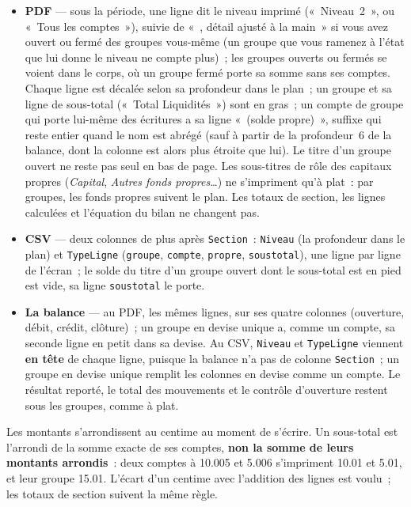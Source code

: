 \documentclass[a4paper,11pt,oneside]{article}
\begin{document}
\begin{itemize}
    \item \textbf{PDF} --- sous la période, une ligne dit le niveau imprimé («~Niveau~2~», ou
          «~Tous les comptes~»), suivie de «~, détail ajusté à la main~» si vous avez ouvert ou
          fermé des groupes vous-même (un groupe que vous ramenez à l'état que lui donne le niveau ne
          compte plus)~; les groupes ouverts ou fermés se voient dans le corps, où
          un groupe fermé porte sa somme sans ses comptes. Chaque ligne est décalée selon sa
          profondeur dans le plan~; un groupe et sa ligne de sous-total («~Total Liquidités~») sont
          en gras~; un compte de groupe qui porte lui-même des écritures a sa ligne
          «~(solde propre)~», suffixe qui reste entier quand le nom est abrégé (sauf à partir de la profondeur~6 de la balance, dont la colonne est alors plus étroite que lui). Le titre d'un groupe ouvert ne reste pas seul en bas de page. Les
          sous-titres de rôle des capitaux propres (\emph{Capital}, \emph{Autres fonds
          propres}\ldots) ne s'impriment qu'à plat~: par groupes, les fonds propres suivent le plan.
          Les totaux de section, les lignes calculées et l'équation du bilan ne changent pas.
    \item \textbf{CSV} --- deux colonnes de plus après \texttt{Section}~: \texttt{Niveau} (la
          profondeur dans le plan) et \texttt{TypeLigne} (\texttt{groupe}, \texttt{compte},
          \texttt{propre}, \texttt{soustotal}), une ligne par ligne de l'écran~; le solde du titre
          d'un groupe ouvert dont le sous-total est en pied est vide, sa ligne \texttt{soustotal}
          le porte.
    \item \textbf{La balance} --- au PDF, les mêmes lignes, sur ses quatre colonnes (ouverture,
          débit, crédit, clôture)~; un groupe en devise unique a, comme un compte, sa seconde ligne en
          petit dans sa devise. Au CSV, \texttt{Niveau} et \texttt{TypeLigne} viennent \textbf{en
          tête} de chaque ligne, puisque la balance n'a pas de colonne \texttt{Section}~; un groupe
          en devise unique remplit les colonnes en devise comme un compte. Le résultat reporté, le
          total des mouvements et le contrôle d'ouverture restent sous les groupes, comme à plat.
\end{itemize}
Les montants s'arrondissent au centime au moment de s'écrire. Un sous-total est l'arrondi de la
somme exacte de ses comptes, \textbf{non la somme de leurs montants arrondis}~: deux comptes à
10.005 et 5.006 s'impriment 10.01 et 5.01, et leur groupe 15.01. L'écart d'un centime avec
l'addition des lignes est voulu~; les totaux de section suivent la même règle.
\end{document}
